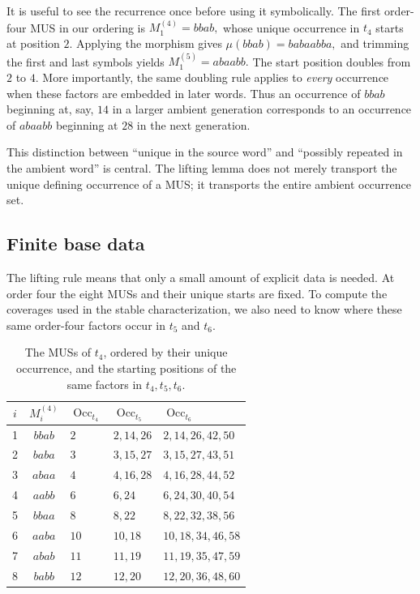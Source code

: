\documentclass[11pt,a4paper]{article}
\theoremstyle{definition}\newtheorem{definition}[theorem]{Definition}
\theoremstyle{remark}\newtheorem{remark}[theorem]{Remark}
\newcommand{\Occ}{\operatorname{Occ}}
\begin{document}
It is useful to see the recurrence once before using it symbolically. The first order-four MUS in our ordering is
$
M_1^{(4)}=bbab,
$
whose unique occurrence in $t_4$ starts at position $2$. Applying the morphism gives
$
\mu(bbab)=babaabba,
$
and trimming the first and last symbols yields
$
M_1^{(5)}=abaabb.
$
The start position doubles from $2$ to $4$. More importantly, the same doubling rule applies to \emph{every} occurrence when these factors are embedded in later words. Thus an occurrence of $bbab$ beginning at, say, $14$ in a larger ambient generation corresponds to an occurrence of $abaabb$ beginning at $28$ in the next generation.

This distinction between ``unique in the source word'' and ``possibly repeated in the ambient word'' is central. The lifting lemma does not merely transport the unique defining occurrence of a MUS; it transports the entire ambient occurrence set.

\subsection{Finite base data}
\label{subsec:base-data}

The lifting rule means that only a small amount of explicit data is needed. At order four the eight MUSs and their unique starts are fixed. To compute the coverages used in the stable characterization, we also need to know where these same order-four factors occur in $t_5$ and $t_6$.

\begin{table}[ht]
\centering
\caption{The MUSs of $t_4$, ordered by their unique occurrence, and the starting positions of the same factors in $t_4,t_5,t_6$.}
\label{tab:base-occurrences}
\begin{tabular}{@{}cclll@{}}
\toprule
$i$ & $M_i^{(4)}$ & $\Occ_{t_4}$ & $\Occ_{t_5}$ & $\Occ_{t_6}$ \\
\midrule
1 & $bbab$ & $2$  & $2,14,26$ & $2,14,26,42,50$ \\
2 & $baba$ & $3$  & $3,15,27$ & $3,15,27,43,51$ \\
3 & $abaa$ & $4$  & $4,16,28$ & $4,16,28,44,52$ \\
4 & $aabb$ & $6$  & $6,24$    & $6,24,30,40,54$ \\
5 & $bbaa$ & $8$  & $8,22$    & $8,22,32,38,56$ \\
6 & $aaba$ & $10$ & $10,18$   & $10,18,34,46,58$ \\
7 & $abab$ & $11$ & $11,19$   & $11,19,35,47,59$ \\
8 & $babb$ & $12$ & $12,20$   & $12,20,36,48,60$ \\
\bottomrule
\end{tabular}
\end{table}
\end{document}
